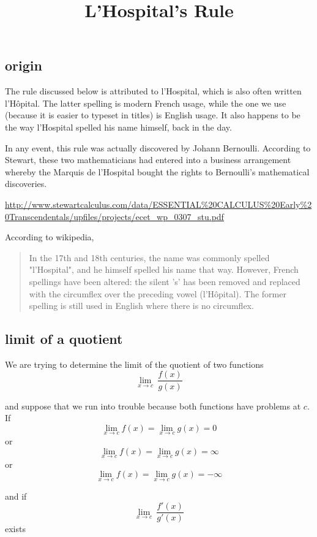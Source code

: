 \documentclass[11pt, oneside]{article}
\title{L'Hospital's Rule}
\date{}
\begin{document}
\maketitle
\Large

\label{sec:Hospital}

\subsection*{origin}
The rule discussed below is attributed to l'Hospital, which is also often written l'H\^{o}pital.  The latter spelling is modern French usage, while the one we use (because it is easier to typeset in titles) is English usage.  It also happens to be the way l'Hospital spelled his name himself, back in the day.

In any event, this rule was actually discovered by Johann Bernoulli.  According to Stewart, these two mathematicians had entered into a business arrangement whereby the Marquis de l'Hospital bought the rights to Bernoulli's mathematical discoveries.

\url{http://www.stewartcalculus.com/data/ESSENTIAL%20CALCULUS%20Early%20Transcendentals/upfiles/projects/ecet_wp_0307_stu.pdf}

According to wikipedia,

\begin{quote}
In the 17th and 18th centuries, the name was commonly spelled "l'Hospital", and he himself spelled his name that way. However, French spellings have been altered: the silent 's' has been removed and replaced with the circumflex over the preceding vowel (l'H\^{o}pital). The former spelling is still used in English where there is no circumflex.\end{quote}

\subsection*{limit of a quotient}

We are trying to determine the limit of the quotient of two functions
\[ \lim_{x \rightarrow c} \ \frac{f(x)}{g(x)} \]

and suppose that we run into trouble because both functions have problems at $c$.  If
\[ \lim_{x \rightarrow c} f(x) = \lim_{x \rightarrow c} g(x) = 0 \]
or 
\[ \lim_{x \rightarrow c} f(x) = \lim_{x \rightarrow c} g(x) = \infty \]
or
\[ \lim_{x \rightarrow c} f(x) = \lim_{x \rightarrow c} g(x) = -\infty \]

and if 
\[ \lim_{x \rightarrow c} \ \frac{f'(x)}{g'(x)} \]
exists
\end{document}
